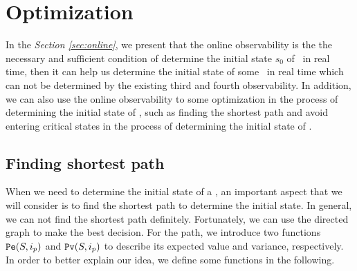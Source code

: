 \section{Optimization}
\label{sec:app}

In the {\em Section \ref{sec:online}}, we present that the online observability is the the necessary and sufficient condition of determine the initial state $s_0$ of \BCNs\ in real time, then it can help us determine the initial state of some \BCNs\ in real time which can not be determined by the existing third and fourth observability. In addition, we can also use the online observability to some optimization in the process of determining the initial state of \BCNs, such as finding the shortest path and avoid entering critical states in the process of determining the initial state of \BCNs. %


\subsection{Finding shortest path}
When we need to determine the initial state of a \BCN, an important aspect that we will consider is to find the shortest path to determine the initial state. In general, we can not find the shortest path definitely.  Fortunately, we can use the directed graph to make the best decision. For the path, we introduce two functions ${\tt Pe}(S, i_p)$ and ${\tt Pv}(S, i_p)$ to describe its expected value and variance, respectively. In order to better explain our idea, we define some functions in the following.



